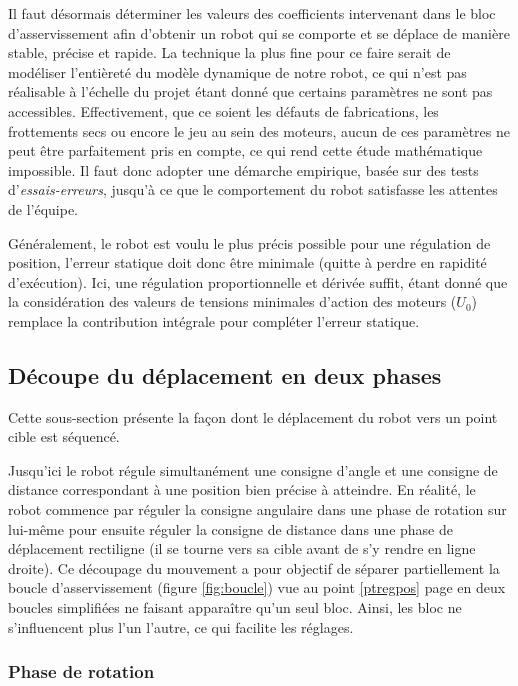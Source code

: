 \documentclass[a4paper,11pt]{article}
\begin{document}
Il faut désormais déterminer les valeurs des coefficients intervenant dans le bloc d'asservissement afin d'obtenir un robot qui se comporte et se déplace de manière stable, précise et rapide. La technique la plus fine pour ce faire serait de modéliser l'entièreté du modèle dynamique de notre robot, ce qui n'est pas réalisable à l'échelle du projet étant donné que certains paramètres ne sont pas accessibles. Effectivement, que ce soient les défauts de fabrications, les frottements secs ou encore le jeu au sein des moteurs, aucun de ces paramètres ne peut être parfaitement pris en compte, ce qui rend cette étude mathématique impossible. Il faut donc adopter une démarche empirique, basée sur des tests d'\textit{essais-erreurs}, jusqu'à ce que le comportement du robot satisfasse les attentes de l'équipe.
\newline

Généralement, le robot est voulu le plus précis possible pour une régulation de position, l'erreur statique doit donc être minimale (quitte à perdre en rapidité d'exécution).
Ici, une régulation proportionnelle et dérivée suffit, étant donné que la considération des valeurs de tensions minimales d'action des moteurs ($U_{0}$) remplace la contribution intégrale pour compléter l'erreur statique.

\subsection{\label{subsec:phases}Découpe du déplacement en deux phases}

Cette sous-section présente la façon dont le déplacement du robot vers un point cible est séquencé.

Jusqu'ici le robot régule simultanément une consigne d'angle et une consigne de distance correspondant à une position bien précise à atteindre. En réalité, le robot commence par réguler la consigne angulaire dans une phase de rotation sur lui-même pour ensuite réguler la consigne de distance dans une phase de déplacement rectiligne (il se tourne vers sa cible avant de s'y rendre en ligne droite). Ce découpage du mouvement a pour objectif de séparer partiellement la boucle d'asservissement (figure \ref{fig:boucle}) vue au point \ref{ptregpos} page \pageref{ptregpos} en deux boucles simplifiées ne faisant apparaître qu'un seul bloc. Ainsi, les bloc ne s'influencent plus l'un l'autre, ce qui facilite les réglages.

\subsubsection{Phase de rotation}
\end{document}
